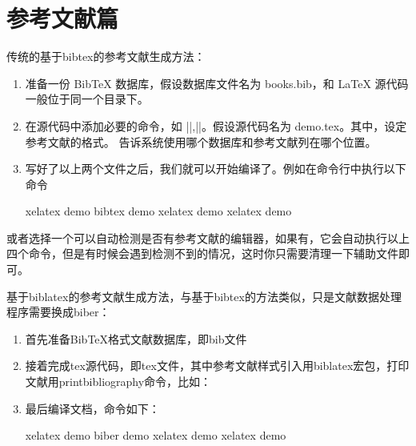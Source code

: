 
\section{参考文献篇}



传统的基于bibtex的参考文献生成方法：

\begin{enumerate}

\item
  准备一份 BibTeX 数据库，假设数据库文件名为 books.bib，和 LaTeX
  源代码一般位于同一个目录下。
\item
  在源代码中添加必要的命令，如 ||,||。假设源代码名为
   demo.tex。其中，设定参考文献的格式。
  告诉系统使用哪个数据库和参考文献列在哪个位置。
\item
  写好了以上两个文件之后，我们就可以开始编译了。例如在命令行中执行以下命令
  
\begin{texinlist}
xelatex demo
bibtex demo
xelatex demo
xelatex demo
\end{texinlist}
\end{enumerate}



或者选择一个可以自动检测是否有参考文献的编辑器，如果有，它会自动执行以上四个命令，但是有时候会遇到检测不到的情况，这时你只需要清理一下辅助文件即可。

基于biblatex的参考文献生成方法，与基于bibtex的方法类似，只是文献数据处理程序需要换成biber：

\begin{enumerate}
\item 首先准备BibTeX格式文献数据库，即bib文件

\item 接着完成tex源代码，即tex文件，其中参考文献样式引入用biblatex宏包，打印文献用printbibliography命令，比如：


\item 最后编译文档，命令如下：

\begin{texinlist}
xelatex demo
biber demo
xelatex demo
xelatex demo
\end{texinlist}

\end{enumerate}


